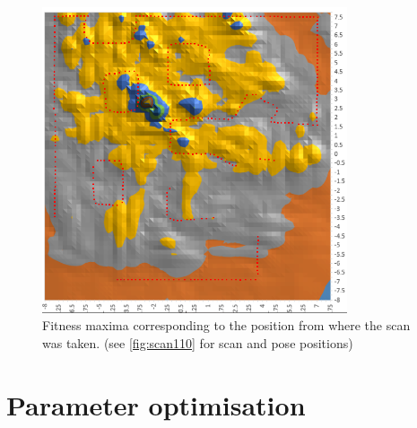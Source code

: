 \documentclass[authoryearcitations]{UoYCSproject}
\begin{document}
\begin{figure}[ht]
\centering
	\includegraphics[width=9cm,keepaspectratio]{images/landscape_overlay.png}
	\caption{Fitness maxima corresponding to the position from where the scan was taken. (see \autoref{fig:scan110} for scan and pose positions)}
	\label{fig:landscape}
\end{figure}

\section{Parameter optimisation}
\end{document}
